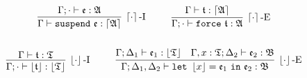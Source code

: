 \begin{gather*}
\infer[\ceil{\cdot}\mbox{-I}]{\Gamma \vdash \mathtt{suspend}~\e : \ceil{\A}}{\Gamma; \cdot \vdash \e : \A}
~~~~ ~~~~
\infer[\ceil{\cdot}\mbox{-E}]{\Gamma; \cdot \vdash \mathtt{force}~\t : \A}{\Gamma \vdash \t : \ceil{\A}}
\\ \\ 
\infer[\floor{\cdot}\mbox{-I}]{\Gamma; \cdot \vdash \floor{\t} : \floor{\T}}{\Gamma \vdash \t : \T}
~~~~ ~~~~
\infer[\floor{\cdot}\mbox{-E}]{\Gamma; \Delta_1, \Delta_2 \vdash \mathtt{let}~\floor{x} = \e_1~\mathtt{in}~\e_2 : \mathfrak{B}}{
    \Gamma; \Delta_1 \vdash \e_1 : \floor{\T}
    &
    \Gamma, x : \T; \Delta_2 \vdash \e_2 : \mathfrak{B}
}
\end{gather*}